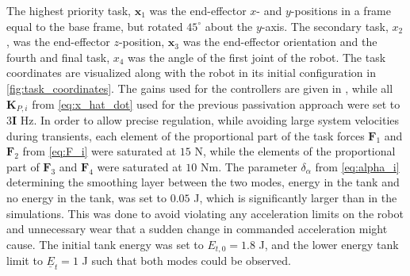 \documentclass[../main.tex]{subfiles}
\begin{document}
The highest priority task, $\bm{x}_1$ was the end-effector $x$- and $y$-positions in a frame equal to the base frame, but rotated $45^\circ$ about the $y$-axis. The secondary task, $x_2$, was the end-effector $z$-position, $\bm{x}_3$ was the end-effector orientation and the fourth and final task, $x_4$ was the angle of the first joint of the robot. The task coordinates are visualized along with the robot in its initial configuration in \cref{fig:task_coordinates}.
The gains used for the controllers are given in , while all \(\bm{K}_{P,i}\) from \eqref{eq:x_hat_dot} used for the previous passivation approach were set to \(3\bm{I}\) Hz. In order to allow precise regulation, while avoiding large system velocities during transients, each element of the proportional part of the task forces $\bm{F}_1$ and $\bm{F}_2$ from \eqref{eq:F_i} were saturated at $15$ N, while the elements of the proportional part of $\bm{F}_3$ and $\bm{F}_4$ were saturated at $10$ Nm.  
The parameter $\delta_\alpha$ from \eqref{eq:alpha_i} determining the smoothing layer between the two modes, energy in the tank and no energy in the tank, was set to $0.05$ J, which is significantly larger than in the simulations. This was done to avoid violating any acceleration limits on the robot and unnecessary wear that a sudden change in commanded acceleration might cause. The initial tank energy was set to $E_{t,0}=1.8$ J, and the lower energy tank limit to $\underline{E}_{t}=1$ J such that both modes could be observed.
\end{document}
